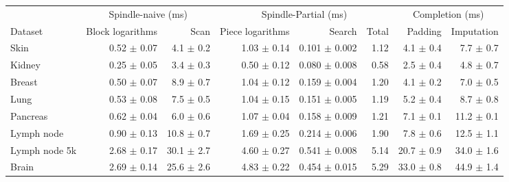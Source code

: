 \begin{tabular}{lrrrrrrr}
\toprule
 & \multicolumn{2}{c}{Spindle-naive (ms)} & \multicolumn{3}{c}{Spindle-Partial (ms)} & \multicolumn{2}{c}{Completion (ms)} \\
\cmidrule(lr){2-3} \cmidrule(lr){4-6} \cmidrule(lr){7-8}
Dataset & Block logarithms & Scan & Piece logarithms & Search & Total & Padding & Imputation \\
\midrule
Skin & 0.52 $\pm$ 0.07 & 4.1 $\pm$ 0.2 & 1.03 $\pm$ 0.14 & 0.101 $\pm$ 0.002 & 1.12 & 4.1 $\pm$ 0.4 & 7.7 $\pm$ 0.7 \\
Kidney & 0.25 $\pm$ 0.05 & 3.4 $\pm$ 0.3 & 0.50 $\pm$ 0.12 & 0.080 $\pm$ 0.008 & 0.58 & 2.5 $\pm$ 0.4 & 4.8 $\pm$ 0.7 \\
Breast & 0.50 $\pm$ 0.07 & 8.9 $\pm$ 0.7 & 1.04 $\pm$ 0.12 & 0.159 $\pm$ 0.004 & 1.20 & 4.1 $\pm$ 0.2 & 7.0 $\pm$ 0.5 \\
Lung & 0.53 $\pm$ 0.08 & 7.5 $\pm$ 0.5 & 1.04 $\pm$ 0.15 & 0.151 $\pm$ 0.005 & 1.19 & 5.2 $\pm$ 0.4 & 8.7 $\pm$ 0.8 \\
Pancreas & 0.62 $\pm$ 0.04 & 6.0 $\pm$ 0.6 & 1.07 $\pm$ 0.04 & 0.158 $\pm$ 0.009 & 1.21 & 7.1 $\pm$ 0.1 & 11.2 $\pm$ 0.1 \\
Lymph node & 0.90 $\pm$ 0.13 & 10.8 $\pm$ 0.7 & 1.69 $\pm$ 0.25 & 0.214 $\pm$ 0.006 & 1.90 & 7.8 $\pm$ 0.6 & 12.5 $\pm$ 1.1 \\
Lymph node 5k & 2.68 $\pm$ 0.17 & 30.1 $\pm$ 2.7 & 4.60 $\pm$ 0.27 & 0.541 $\pm$ 0.008 & 5.14 & 20.7 $\pm$ 0.9 & 34.0 $\pm$ 1.6 \\
Brain & 2.69 $\pm$ 0.14 & 25.6 $\pm$ 2.6 & 4.83 $\pm$ 0.22 & 0.454 $\pm$ 0.015 & 5.29 & 33.0 $\pm$ 0.8 & 44.9 $\pm$ 1.4 \\
\bottomrule
\end{tabular}
